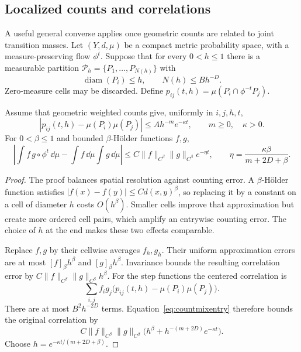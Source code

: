 \subsection{Localized counts and correlations}
\label{subsec:countmixlocalized}

A useful general converse applies once geometric counts are related
to joint transition masses. Let $(Y,d,\mu)$ be a compact metric
probability space, with a measure-preserving flow $\phi^t$. Suppose
that for every $0<h\leq1$ there is a measurable partition
$\mathcal P_h=\{P_1,\ldots,P_{N(h)}\}$ with
\[
 \operatorname{diam}(P_i)\leq h,\qquad N(h)\leq B h^{-D}.
\]
Zero-measure cells may be discarded. Define
$p_{ij}(t,h)=\mu(P_i\cap\phi^{-t}P_j)$.

\begin{proposition}
\label{prop:countmixlocalized}
Assume that geometric weighted counts give, uniformly in $i,j,h,t$,
\begin{equation}
 |p_{ij}(t,h)-\mu(P_i)\mu(P_j)|
       \leq A h^{-m}e^{-\kappa t},
 \qquad m\geq0,\quad\kappa>0.
 \label{eq:countmixentry}
\end{equation}
For $0<\beta\leq1$ and bounded $\beta$-H\"older functions $f,g$,
\begin{equation}
 \left|\int f\,g\circ\phi^t\,\dd\mu-\int f\,\dd\mu\int g\,\dd\mu\right|
 \leq C\|f\|_{C^\beta}\|g\|_{C^\beta}e^{-\eta t},
 \qquad
 \eta=\frac{\kappa\beta}{m+2D+\beta}.
 \label{eq:countmixrate}
\end{equation}
\end{proposition}

\begin{proof}
The proof balances spatial resolution against counting error.
A $\beta$-H\"older function satisfies
$|f(x)-f(y)|\le C d(x,y)^\beta$, so replacing it by a constant
on a cell of diameter $h$ costs $O(h^\beta)$. Smaller cells
improve that approximation but create more ordered cell pairs,
which amplify an entrywise counting error. The choice of $h$
at the end makes these two effects comparable.

Replace $f,g$ by their cellwise averages $f_h,g_h$. Their uniform
approximation errors are at most $[f]_\beta h^\beta$ and
$[g]_\beta h^\beta$. Invariance bounds the resulting correlation
error by $C\|f\|_{C^\beta}\|g\|_{C^\beta}h^\beta$.
For the step functions the centered correlation is
\[
 \sum_{i,j}f_i g_j
       \bigl(p_{ij}(t,h)-\mu(P_i)\mu(P_j)\bigr).
\]
There are at most $B^2h^{-2D}$ terms. Equation~\eqref{eq:countmixentry}
therefore bounds the original correlation by
\[
 C\|f\|_{C^\beta}\|g\|_{C^\beta}
       \bigl(h^\beta+h^{-(m+2D)}e^{-\kappa t}\bigr).
\]
Choose $h=e^{-\kappa t/(m+2D+\beta)}$.
\end{proof}

